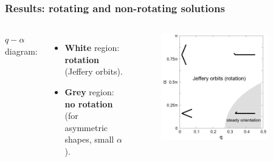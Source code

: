 \documentclass{beamer}
\newcommand{\bi}{\begin{itemize}}
\newcommand{\ei}{\end{itemize}}
\begin{document}



\begin{frame}
	\frametitle{Results: rotating and non-rotating solutions}
	\begin{overlayarea}{\textwidth}{\textheight}
		\vspace{-0.8cm}
		\begin{columns}
			\vspace{0.2cm}
			$q-\alpha$ diagram:
			\bi
		\item \textbf{White} region: \textbf{rotation} (Jeffery orbits). 
		\item \textbf{Grey} region: \textbf{no rotation} 
		(for asymmetric shapes, small $\alpha$). 
		\ei 
			\begin{figure}[htb]
				\begin{center}
					\includegraphics[width=0.85\textwidth]{plots/q_alpha_plot.png}
				\end{center}
			\end{figure}
		\end{columns}
		\vspace{0.5cm}
		\begin{columns}
			\column{.55\textwidth}
		\end{columns}
	\end{overlayarea}
\end{frame}
\end{document}
